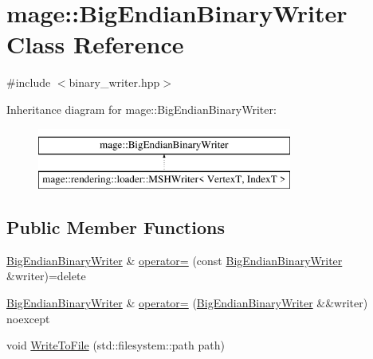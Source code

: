 \hypertarget{classmage_1_1_big_endian_binary_writer}{}\section{mage\+:\+:Big\+Endian\+Binary\+Writer Class Reference}
\label{classmage_1_1_big_endian_binary_writer}


{\ttfamily \#include $<$binary\+\_\+writer.\+hpp$>$}

Inheritance diagram for mage\+:\+:Big\+Endian\+Binary\+Writer\+:\begin{figure}[H]
\begin{center}
\leavevmode
\includegraphics[height=2.000000cm]{classmage_1_1_big_endian_binary_writer}
\end{center}
\end{figure}
\subsection*{Public Member Functions}
\begin{DoxyCompactItemize}
\item 
\mbox{\hyperlink{classmage_1_1_big_endian_binary_writer}{Big\+Endian\+Binary\+Writer}} \& \mbox{\hyperlink{classmage_1_1_big_endian_binary_writer_ae574f7d0b630890256996c52818ba633}{operator=}} (const \mbox{\hyperlink{classmage_1_1_big_endian_binary_writer}{Big\+Endian\+Binary\+Writer}} \&writer)=delete
\item 
\mbox{\hyperlink{classmage_1_1_big_endian_binary_writer}{Big\+Endian\+Binary\+Writer}} \& \mbox{\hyperlink{classmage_1_1_big_endian_binary_writer_a8c01bf43f5e941578c5c5947ea184a78}{operator=}} (\mbox{\hyperlink{classmage_1_1_big_endian_binary_writer}{Big\+Endian\+Binary\+Writer}} \&\&writer) noexcept
\item 
void \mbox{\hyperlink{classmage_1_1_big_endian_binary_writer_a6ce9780687a45a6c6f98e0843190b63b}{Write\+To\+File}} (std\+::filesystem\+::path path)
\end{DoxyCompactItemize}
